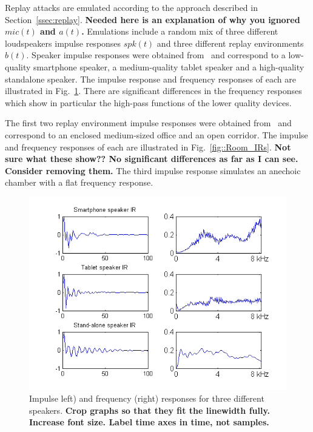 
Replay attacks are emulated according to the approach described in Section~\ref{ssec:replay}.
{\bfseries Needed here is an explanation of why you ignored $mic(t)$ and $a(t)$.}  Emulations include a random mix of three different loudspeakers impulse responses $spk(t)$ and three different replay environments $b(t)$.  Speaker impulse responses were obtained from~\cite{Brown2014} and correspond to a low-quality smartphone speaker, a medium-quality tablet speaker and a high-quality standalone speaker.  The impulse response and frequency responses of each are illustrated in Fig.~\ref{fig::IRs}.  There are significant differences in the frequency responses which show in particular the high-pass functions of the lower quality devices.

The first two replay environment impulse responses were obtained from~\cite{Jeub2009} and correspond to an enclosed medium-sized office and an open corridor.  The impulse and frequency responses of each are illustrated in Fig.~\ref{fig::Room_IRs}.  {\bfseries Not sure what these show??  No significant differences as far as I can see.  Consider removing them.}  The third impulse response simulates an anechoic chamber with a flat frequency response. 


\begin{figure}
	\centering
	\includegraphics[width=1\linewidth]{Figs/IRs.png}
	\caption{Impulse left) and frequency (right) responses for three different speakers. {\bfseries Crop graphs so that they fit the linewidth fully.  Increase font size.  Label time axes in time, not samples.}}
	\label{fig::IRs}
\end{figure}


